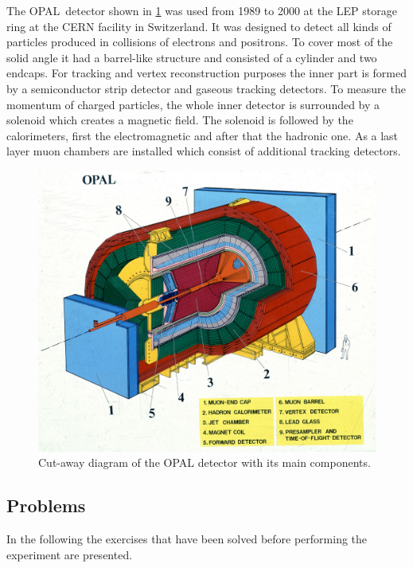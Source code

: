 \documentclass[11pt, a4paper]{article}
\numberwithin{equation}{section}
\begin{document}
The OPAL~detector shown in \ref{fig:opal} was used from 1989 to 2000 at the LEP storage ring at the CERN facility in Switzerland.
It was designed to detect all kinds of particles produced in collisions of electrons and positrons.
To cover most of the solid angle it had a barrel-like structure and consisted of a cylinder and two endcaps.
For tracking and vertex reconstruction purposes the inner part is formed by a semiconductor strip detector and gaseous tracking detectors.
To measure the momentum of charged particles, the whole inner detector is surrounded by a solenoid which creates a magnetic field.
The solenoid is followed by the calorimeters, first the electromagnetic and after that the hadronic one.
As a last layer muon chambers are installed which consist of additional tracking detectors.
\begin{figure}[h]
	\centering
	\includegraphics[width=.8\textwidth]{./figures/theory/opal}
	\caption{Cut-away diagram of the OPAL detector with its main components\protect\footnotemark.}
	\label{fig:opal}
\end{figure}

\subsection{Problems}
In the following the exercises that have been solved before performing the experiment are presented.
\label{sec:problems}
\end{document}

